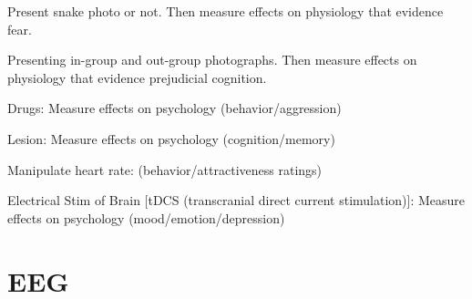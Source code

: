 \begin{coloredlist}
    \item Present snake photo or not. Then measure effects on physiology that evidence fear.
    \item Presenting in-group and out-group photographs. Then measure effects on physiology that evidence prejudicial cognition.
    \item Drugs: Measure effects on psychology (behavior/aggression)
    \item Lesion: Measure effects on psychology (cognition/memory)
    \item Manipulate heart rate: (behavior/attractiveness ratings)
    \item Electrical Stim of Brain [tDCS (transcranial direct current stimulation)]: Measure effects on psychology (mood/emotion/depression)
\end{coloredlist}

\section{EEG}

